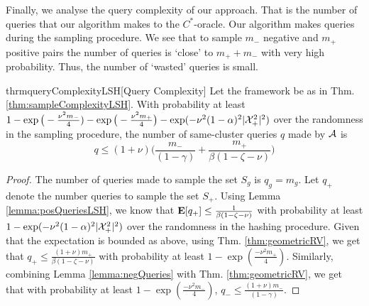Finally, we analyse the query complexity of our approach. That is the number of queries that our algorithm makes to the $C^*$-oracle. Our algorithm makes queries during the sampling procedure. We see that to sample $m_-$ negative and $m_+$ positive pairs the number of queries is `close' to $m_+ + m_-$ with very high probability. Thus, the number of `wasted' queries is small.  

\begin{restatable}{thrm}{queryComplexityLSH}[Query Complexity]
\label{thm:queryComplexity}
Let the framework be as in Thm. \ref{thm:sampleComplexityLSH}. With probability at least $1-\exp\big(-\frac{\nu^2m_-}{4}) - \exp\big(-\frac{\nu^2m_+}{4}\big) - \exp(-\nu^2(1-\alpha)^2|\mathcal X_+^2|^2)$ over the randomness in the sampling procedure, the number of same-cluster queries $q$ made by $\mathcal A$ is  
$$q \le (1+\nu)\bigg(\frac{m_-}{(1-\gamma)} + \frac{m_+}{\beta(1-\zeta-\nu)}\bigg)$$
\end{restatable}

\begin{proof}
The number of queries made to sample the set $S_g$ is $q_g = m_g$. Let $q_+$ denote the number queries to sample the set $S_+$. Using Lemma \ref{lemma:posQueriesLSH}, we know that $\mathbf E[q_+] \le \frac{1}{\beta(1-\zeta-\nu)}$ with probability at least $1-\exp(-\nu^2(1-\alpha)^2|\mathcal X_+^2|^2)$ over the randomness in the hashing procedure. Given that the expectation is bounded as above, using Thm. \ref{thm:geometricRV}, we get that $q_+ \le \frac{(1+\nu)m_+}{\beta(1-\zeta-\nu)}$ with probability at least $1-\exp(\frac{-\nu^2m_+}{4})$. Similarly, combining Lemma \ref{lemma:negQueries} with Thm. \ref{thm:geometricRV}, we get that with probability at least $1-\exp(\frac{-\nu^2m_-}{4})$, $q_- \le \frac{(1+\nu)m_-}{(1-\gamma)}$.
\end{proof}
